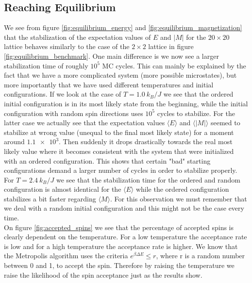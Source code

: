 \documentclass[%
 reprint,
nofootinbib,
aps,
]{revtex4-1}
\begin{document}
\subsection{Reaching Equilibrium}\label{sec:reaching_equilibrium}
We see from figure \ref{fig:equilibrium_energy} and \ref{fig:equilibrium_magnetization} that the stabilization of the expectation values of $E$ and $|M|$ for the $20\times 20$ lattice behaves similarly to the case of the $2\times2$ lattice in figure \ref{fig:equilibrium_benchmark}. One main difference is we now see a larger stabilization time of roughly $10^5$ MC cycles. This can mainly be explained by the fact that we have a more complicated system (more possible microstates), but more importantly that we have used different temperatures and initial configurations. If we look at the case of $T = 1.0 \ k_B/J$ we see that the ordered initial configuration is in its most likely state from the beginning, while the initial configuration with random spin directions uses $10^5$ cycles to stabilize. For the latter case we actually see that the expectation values $\langle E \rangle$ and $\langle |M| \rangle$ seemed to stabilize at wrong value (unequal to the final most likely state) for a moment around $\num{1.1e3}$. Then suddenly it drops drastically towards the real most likely value where it becomes consistent with the system that were initialized with an ordered configuration. This shows that certain "bad" starting configurations demand a larger number of cycles in order to stabilize properly. For $T = 2.4 \ k_B/J$ we see that the stabilization time for the ordered and random configuration is almost identical for the $\langle E \rangle$ while the ordered configuration stabilizes a bit faster regarding $\langle M \rangle$. For this observation we must remember that we deal with a random initial configuration and this might not be the case every time.\\
On figure \ref{fig:accepted_spins} we see that the percentage of accepted spins is clearly dependent on the temperature. For a low temperature the acceptance rate is low and for a high temperature the acceptance rate is higher. We know that the Metropolis algorithm uses the criteria $e^{\beta \Delta E} \leq r$, where r is a random number between 0 and 1, to accept the spin. Therefore by raising the temperature we raise the likelihood of the spin acceptance just as the results show.
\end{document}
